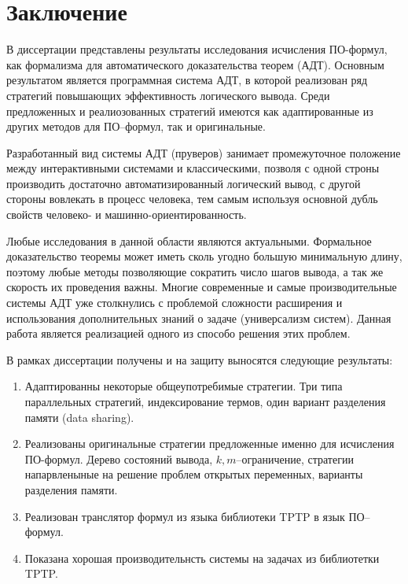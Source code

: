 \chapter*{Заключение}

В диссертации представлены результаты исследования исчисления ПО-формул, как формализма для автоматического доказательства теорем (АДТ). Основным результатом является программная система АДТ, в которой реализован ряд стратегий повышающих эффективность логического вывода. Среди предложенных и реалиозованных стратегий имеются как адаптированные из других методов для ПО--формул, так и оригинальные. 

Разработанный вид системы АДТ (пруверов) занимает промежуточное положение между интерактивными системами и классическими, позволя с одной строны производить достаточно автоматизированный логический вывод, с другой стороны вовлекать в процесс человека, тем самым используя основной дубль свойств человеко- и машинно-ориентированность.

Любые исследования в данной области являются актуальными. Формальное доказательство теоремы может иметь сколь угодно большую минимальную длину, поэтому любые методы позволяющие сократить число шагов вывода, а так же скорость их проведения важны. Многие современные и самые производительные системы АДТ уже столкнулись с проблемой сложности расширения и использования дополнительных знаний о задаче (универсализм систем). Данная работа является реализацией одного из способо решения этих проблем.


В рамках диссертации получены и на защиту выносятся следующие результаты:
\begin{enumerate}
\item Адаптированны некоторые общеупотребимые стратегии. Три типа параллельных стратегий, индексирование термов, один вариант разделения памяти (data sharing).
\item Реализованы оригинальные стратегии предложенные именно для исчисления ПО-формул. Дерево состояний вывода, $k,m$--ограничение, стратегии напарвленыные на решение проблем открытых переменных, варианты разделения памяти.
\item Реализован транслятор формул из языка библиотеки TPTP в язык ПО--формул.
\item Показана хорошая производительнсть системы на задачах из библиотетки TPTP.
\end{enumerate}

